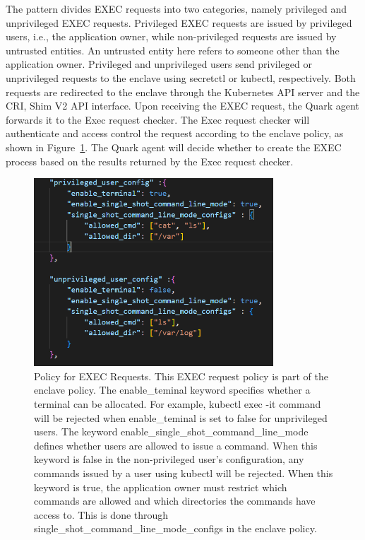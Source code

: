 The pattern divides EXEC requests into two categories, namely privileged and unprivileged EXEC requests. Privileged EXEC requests are issued by privileged users, i.e., the application owner, while non-privileged requests are issued by untrusted 
entities. An untrusted entity here refers to someone other than the application owner. Privileged and unprivileged users send privileged or unprivileged requests to the enclave using secretctl or kubectl, respectively. Both requests are redirected 
to the enclave through the Kubernetes  API server and the CRI, Shim V2 API interface. Upon receiving the EXEC request, the Quark agent forwards it to the Exec request checker. The Exec request checker will authenticate and access control the request 
according to the enclave policy, as shown in Figure~\ref{fig:exec_policy}. The Quark agent will decide whether to create the EXEC process based on the results returned by the Exec request checker.
\begin{figure}[H]
    \centering
    \includegraphics[width=0.8\textwidth]{images/exec_policy.png}
    \caption[Policy for EXEC Requests]{Policy for EXEC Requests. This EXEC request policy is part of the enclave policy. The enable\_teminal keyword specifies whether a terminal can be 
    allocated. For example, kubectl exec -it command will be rejected when enable\_teminal is set to false for unprivileged users. The keyword enable\_single\_shot\_command\_line\_mode 
    defines whether users are allowed to issue a command. When this keyword is false in the non-privileged user's configuration, any commands issued by a user using kubectl will be 
    rejected. When this keyword is true, the application owner must restrict which commands are allowed and which directories the commands have access to. This is done through single\_shot\_command\_line\_mode\_configs in the enclave policy.}
    \label{fig:exec_policy}
\end{figure}



